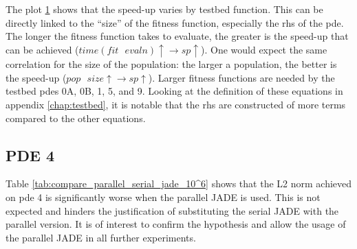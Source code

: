 \documentclass[./\jobname.tex]{subfiles}
\begin{document}
\begin{figure}[H]
	\centering
	\noindent{}
	\label{fig:serial_to_parallel_speedup}
\end{figure}

The plot \ref{fig:serial_to_parallel_speedup} shows that the speed-up varies by testbed function. This can be directly linked to the ``size'' of the fitness function, especially the \gls{rhs} of the \gls{pde}. The longer the fitness function takes to evaluate, the greater is the speed-up that can be achieved ($time(fit \text{ } evaln) \uparrow \rightarrow sp \uparrow$). One would expect the same correlation for the size of the population: the larger a population, the better is the speed-up ($pop \text{ } size \uparrow \rightarrow sp \uparrow$). Larger fitness functions are needed by the testbed \gls{pde}s 0A, 0B, 1, 5, and 9. Looking at the definition of these equations in appendix \ref{chap:testbed}, it is notable that the \gls{rhs} are constructed of more terms compared to the other equations. 

\subsection{PDE 4}

Table \ref{tab:compare_parallel_serial_jade_10^6} shows that the L2 norm achieved on \gls{pde} 4 is significantly worse when the parallel JADE is used. This is not expected and hinders the justification of substituting the serial JADE with the parallel version. It is of interest to confirm the hypothesis and allow the usage of the parallel JADE in all further experiments. 
\end{document}
